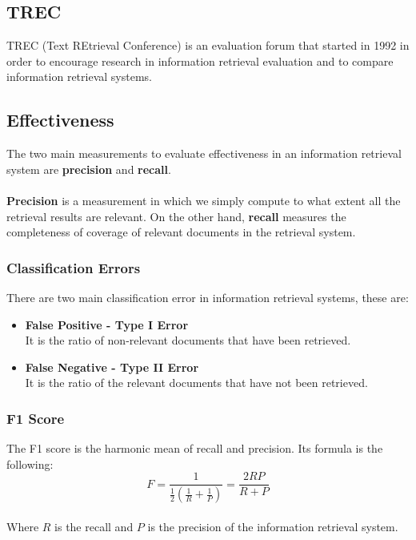 \documentclass{article}
\begin{document}
\subsection{TREC}
TREC (Text REtrieval Conference) is an evaluation forum that started in 1992 in order to encourage research in information retrieval evaluation and to compare information retrieval systems.

\subsection{Effectiveness}
The two main measurements to evaluate effectiveness in an information retrieval system are \textbf{precision} and \textbf{recall}. \\ \\
\textbf{Precision} is a measurement in which we simply compute to what extent all the retrieval results are relevant. On the other hand, \textbf{recall} measures the completeness of coverage of relevant documents in the retrieval system.

\subsubsection{Classification Errors}
There are two main classification error in information retrieval systems, these are:

\begin{itemize}
	\item \textbf{False Positive - Type I Error}
	\vspace{.2cm} \\
	It is the ratio of non-relevant documents that have been retrieved.
	
	\item \textbf{False Negative - Type II Error}
	\vspace{.2cm} \\
	It is the ratio of the relevant documents that have not been retrieved.
\end{itemize}

\subsubsection{F1 Score}
The F1 score is the harmonic mean of recall and precision. Its formula is the following:
\[ F = \frac{1}{\frac{1}{2} \left( \frac{1}{R} + \frac{1}{P} \right)} = \frac{2RP}{R+P} \] \\
Where $R$ is the recall and $P$ is the precision of the information retrieval system.
\end{document}
